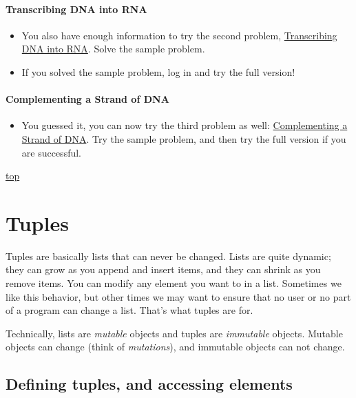 \documentclass[11pt]{article}
\providecommand{\tightlist}{%
      \setlength{\itemsep}{0pt}\setlength{\parskip}{0pt}}
\begin{document}
\hypertarget{transcribing-dna-into-rna}{%
\paragraph{Transcribing DNA into RNA}\label{transcribing-dna-into-rna}}

\begin{itemize}
\tightlist
\item
  You also have enough information to try the second problem,
  \href{http://rosalind.info/problems/rna/}{Transcribing DNA into RNA}.
  Solve the sample problem.
\item
  If you solved the sample problem, log in and try the full version!
\end{itemize}

\hypertarget{complementing-a-strand-of-dna}{%
\paragraph{Complementing a Strand of
DNA}\label{complementing-a-strand-of-dna}}

\begin{itemize}
\tightlist
\item
  You guessed it, you can now try the third problem as well:
  \href{http://rosalind.info/problems/revc/}{Complementing a Strand of
  DNA}. Try the sample problem, and then try the full version if you are
  successful.
\end{itemize}

    \protect\hyperlink{}{top}

    \hypertarget{tuples}{%
\section{Tuples}\label{tuples}}

Tuples are basically lists that can never be changed. Lists are quite
dynamic; they can grow as you append and insert items, and they can
shrink as you remove items. You can modify any element you want to in a
list. Sometimes we like this behavior, but other times we may want to
ensure that no user or no part of a program can change a list. That's
what tuples are for.

Technically, lists are \emph{mutable} objects and tuples are
\emph{immutable} objects. Mutable objects can change (think of
\emph{mutations}), and immutable objects can not change.

\hypertarget{defining-tuples-and-accessing-elements}{%
\subsection{Defining tuples, and accessing
elements}\label{defining-tuples-and-accessing-elements}}
\end{document}
